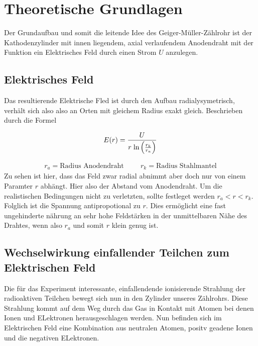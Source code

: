\newpage
\section{Theoretische Grundlagen}

Der Grundaufbau und somit die leitende Idee des Geiger-Müller-Zählrohr ist der Kathodenzylinder %
mit innen liegendem, axial verlaufendem Anodendraht mit der Funktion ein Elektrisches Feld durch einen Strom $U$ anzulegen.

\subsection{Elektrisches Feld}

Das resultierende Elektrische Fled ist durch den Aufbau radialysymetrisch, verhält sich also also an Orten mit gleichem Radius exakt gleich.
Beschrieben durch die Formel 

\begin{equation}  %
\label{eqn:efeld}
E(r) = \frac{U}{r \hspace{0.1cm} \text{ln} \left( \frac{r_k}{r_a} \right) }
\end{equation}

\begin{align*}
r_a = \text{Radius Anodendraht}     \hspace{1cm} r_k = \text{Radius Stahlmantel}
\end{align*}
Zu sehen ist hier, dass das Feld zwar radial abnimmt aber doch nur von einem Paramter $r$ abhängt. Hier also der Abstand vom Anodendraht.
Um die realistischen Bedingungen nicht zu verletzten, sollte festleget werden $r_a<r<r_k$.
Folglich ist die Spannung antipropotional zu $r$. Dies ermöglicht eine fast ungehinderte nährung an sehr hohe Feldstärken in der unmittelbaren Nähe des Drahtes, wenn also $r_a$ und somit $r$ klein genug ist. 

\subsection{Wechselwirkung einfallender Teilchen zum Elektrischen Feld} %
Die für das Experiment interessante, einfallendende ionisierende Strahlung der radioaktiven Teilchen bewegt sich nun in den Zylinder unseres Zählrohrs.
Diese Strahlung kommt auf dem Weg durch das Gas in Kontakt mit Atomen bei denen Ionen und ELektronen herausgeschlagen werden. 
Nun befinden sich im Elektrischen Feld eine Kombination aus neutralen Atomen, positv geadene Ionen und die negativen ELektronen. 

